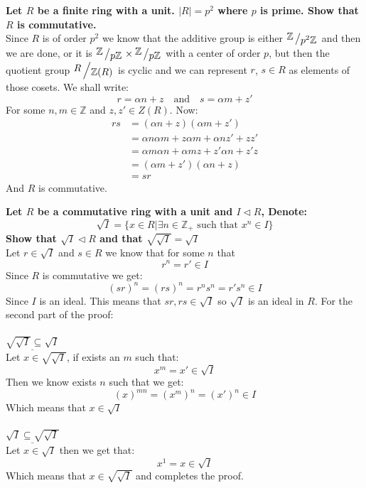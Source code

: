 \documentclass{article}
\theoremstyle{plain}
\DeclareMathOperator{\idealin}{\triangleleft}
\newcommand{\Z}{\mathbb{Z}}
\newcommand{\bigslant}[2]
{{\raisebox{.2em}{$#1$}\left/\raisebox{-.2em}{$#2$}\right.}}
\begin{document}
	\newpage
	
	\textbf{Let $R$ be a finite ring with a unit. $\vert R \vert = p^2$ where 
	$p$ is prime. Show that $R$ is commutative.} \\
	Since $R$ is of order $p^2$ we know that the additive group is either
	$\bigslant{\Z}{p^2\Z}$ and then we are done, or it is 
	$\bigslant{\Z}{p\Z} \times \bigslant{\Z}{p\Z}$ with a center of order
	$p$, but then the quotient group $\bigslant{R}{\Z(R)}$ is cyclic
	and we can represent $r$, $s\in R$ as elements of those cosets. 
	We shall write:
	\[
		r = \alpha n + z \quad \text{and} \quad s = \alpha m + z'
	\]
	For some $n,m\in\Z$ and $z,z'\in Z(R)$. Now:
	\begin{align*}
		rs &= (\alpha n + z)(\alpha m + z')\\
		   &= \alpha n \alpha m + z \alpha m + \alpha n z' + zz' \\
		   &= \alpha m \alpha n + \alpha m z + z' \alpha n + z'z \\
		   &= (\alpha m + z')(\alpha n + z) \\
		   &= sr
	\end{align*}
	And $R$ is commutative.
	
	\newpage
	
	\textbf{Let $R$ be a commutative ring with a unit and $I\idealin R$, 
	Denote: 
	\[ 
		\sqrt{I} = \{x\in R \vert \exists n\in\Z_+ 
	\text{ such that } x^n\in I\}
	\]
	Show that $\sqrt{I}\idealin R$ and that $\sqrt{\sqrt{I}} = \sqrt{I}$} \\
	Let $r\in\sqrt{I}$ and $s\in R$ we know that for some $n$ that
	\[
		r^n = r' \in I
	\]
	Since $R$ is commutative we get:
	\[
		(sr)^n = (rs)^n = r^n s^n = r' s^n \in I
	\]
	Since $I$ is an ideal. This means that $sr,rs\in\sqrt{I}$ so $\sqrt{I}$
	is an ideal in $R$. For the second part of the proof: \\\\
	$\underline{\sqrt{\sqrt{I}} \subseteq \sqrt{I}}$ \\
	Let $x\in\sqrt{\sqrt{I}}$, if exists an $m$ such that:
	\[
		x^m = x'\in\sqrt{I}
	\]
	Then we know exists $n$ such that we get:
	\[
		(x)^{mn} = (x^m)^n = (x')^n \in I
	\]
	Which means that $x\in\sqrt{I}$ \\\\
	$\underline{\sqrt{I} \subseteq \sqrt{\sqrt{I}}}$ \\
	Let $x\in\sqrt{I}$ then we get that:
	\[
		x^1 = x \in \sqrt{I}
	\]
	Which means that $x\in\sqrt{\sqrt{I}}$ and completes the proof.
	
\end{document}
